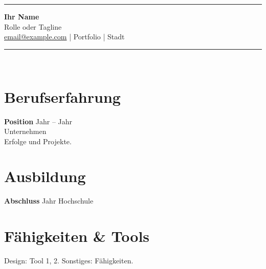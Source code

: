 \documentclass[11pt,a4paper]{article}
\begin{document}
\begin{center}\rule{2.2cm}{2.8cm}\end{center}
\begin{center}
{\LARGE \textbf{Ihr Name}}\\[0.15em]
{\color{gray} Rolle oder Tagline}\\[0.4em]
\href{mailto:email@example.com}{email@example.com} \quad | \quad Portfolio \quad | \quad Stadt
\end{center}
\vspace{0.5em}
\noindent\rule{\textwidth}{1pt}\\[0.3em]
\section*{Berufserfahrung}
\textbf{Position} \hfill Jahr -- Jahr \\
Unternehmen \\
Erfolge und Projekte.

\section*{Ausbildung}
\textbf{Abschluss} \hfill Jahr \quad Hochschule
\section*{Fähigkeiten \& Tools}
Design: Tool 1, 2. \quad Sonstiges: Fähigkeiten.
\end{document}
